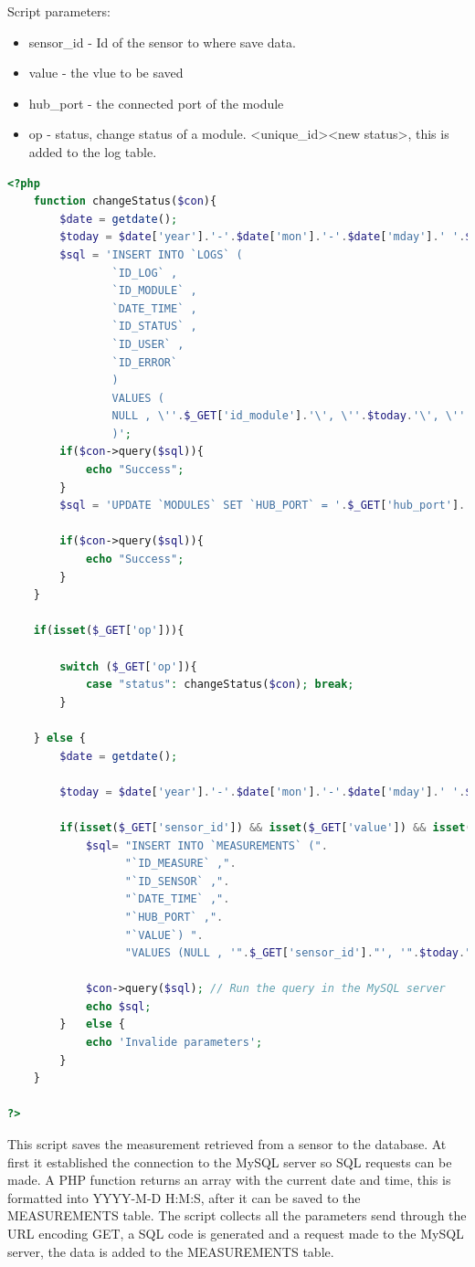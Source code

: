 Script parameters:
\begin{itemize}
	\item sensor\_id - Id of the sensor to where save data.
	\item value - the vlue to be saved
	\item hub\_port - the connected port of the module
	\item op - status, change status of a module. <unique\_id><new status>, this is added to the log table.
\end{itemize}
\begin{lstlisting}[language=php]
<?php
	function changeStatus($con){
		$date = getdate();
		$today = $date['year'].'-'.$date['mon'].'-'.$date['mday'].' '.$date['hours'].':'.$date['minutes'].':'.$date['seconds'];
		$sql = 'INSERT INTO `LOGS` (
				`ID_LOG` ,
				`ID_MODULE` ,
				`DATE_TIME` ,
				`ID_STATUS` ,
				`ID_USER` ,
				`ID_ERROR` 
				)
				VALUES (
				NULL , \''.$_GET['id_module'].'\', \''.$today.'\', \''.$_GET['id_status'].'\', \''.$_SESSION['id_user'].'\', \'1\'
				)';
		if($con->query($sql)){
			echo "Success";
		}
		$sql = 'UPDATE `MODULES` SET `HUB_PORT` = '.$_GET['hub_port'].' WHERE `MODULES`.`UNIQUE_ID` ='.$_GET['id_module'];
		
		if($con->query($sql)){
			echo "Success";
		}
	}
	
	if(isset($_GET['op'])){
		
		switch ($_GET['op']){
			case "status": changeStatus($con); break;	
		}
		
	} else {
		$date = getdate();

		$today = $date['year'].'-'.$date['mon'].'-'.$date['mday'].' '.$date['hours'].':'.$date['minutes'].':'.$date['seconds'];

		if(isset($_GET['sensor_id']) && isset($_GET['value']) && isset($_GET['hub_port'])){
			$sql= "INSERT INTO `MEASUREMENTS` (".
				  "`ID_MEASURE` ,".
			  	  "`ID_SENSOR` ,".
			  	  "`DATE_TIME` ,".
			  	  "`HUB_PORT` ,".
			  	  "`VALUE`) ".
			  	  "VALUES (NULL , '".$_GET['sensor_id']."', '".$today."', '".$_GET['hub_port']."', '".$_GET['value']."')";
	
			$con->query($sql); // Run the query in the MySQL server
			echo $sql;
		}	else {
			echo 'Invalide parameters';	
		}
	}
	
?>
\end{lstlisting}

This script saves the measurement retrieved from a sensor to the database. At first it established the connection to the MySQL server so SQL requests can be made.
A PHP function returns an array with the current date and time, this is formatted into YYYY-M-D H:M:S, after it can be saved to the MEASUREMENTS table. The script collects all the parameters send through the URL encoding GET, a SQL code is generated and a request made to the MySQL server, the data is added to the MEASUREMENTS table.

